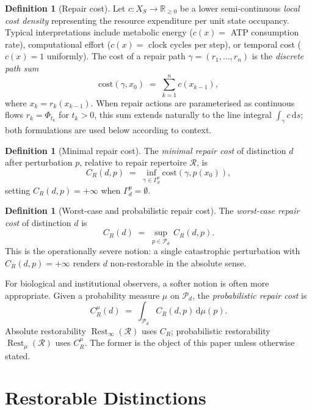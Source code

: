 \documentclass[12pt, oneside]{article}
\theoremstyle{plain}
\theoremstyle{definition}
\newtheorem{definition}[theorem]{Definition}
\theoremstyle{remark}
\theoremstyle{definition}
\DeclareMathOperator{\Rest}{Rest}
\newcommand{\CR}{C_{\!R}}
\newcommand{\Xsub}{X_S}
\newcommand{\Psub}{\mathcal{P}}
\begin{document}
\begin{definition}[Repair cost]
  Let $c : \Xsub \to \mathbb{R}_{\geq 0}$ be a lower semi-continuous
  \emph{local cost density} representing the resource expenditure per
  unit state occupancy.
  Typical interpretations include metabolic energy ($c(x) =$ ATP
  consumption rate), computational effort ($c(x) =$ clock cycles per
  step), or temporal cost ($c(x) = 1$ uniformly).
  The cost of a repair path $\gamma = (r_1, \ldots, r_n)$ is the
  \emph{discrete path sum}
  \[
    \mathrm{cost}(\gamma, x_0)
    \;=\;
    \sum_{k=1}^{n} c\!\left(x_{k-1}\right),
  \]
  where $x_k = r_k(x_{k-1})$.
  When repair actions are parameterised as continuous flows
  $r_k = \Phi_{t_k}$ for $t_k > 0$, this sum extends naturally to
  the line integral $\int_\gamma c\, \mathrm{d}s$; both formulations
  are used below according to context.
\end{definition}

\begin{definition}[Minimal repair cost]
  The \emph{minimal repair cost} of distinction $d$ after perturbation
  $p$, relative to repair repertoire $\mathcal{R}$, is
  \[
    \CR(d, p)
    \;=\;
    \inf_{\gamma \in \Gamma_d^p}
    \mathrm{cost}(\gamma, p(x_0)),
  \]
  setting $\CR(d,p) = +\infty$ when $\Gamma_d^p = \emptyset$.
\end{definition}

\begin{definition}[Worst-case and probabilistic repair cost]
  The \emph{worst-case repair cost} of distinction $d$ is
  \[
    \CR(d)
    \;=\;
    \sup_{p \in \Psub_d}\, \CR(d, p).
  \]
  This is the operationally severe notion: a single catastrophic
  perturbation with $\CR(d,p) = +\infty$ renders $d$ non-restorable
  in the absolute sense.

  For biological and institutional observers, a softer notion is
  often more appropriate.
  Given a probability measure $\mu$ on $\Psub_d$, the
  \emph{probabilistic repair cost} is
  \[
    \CR^\mu(d)
    \;=\;
    \int_{\Psub_d} \CR(d, p)\, \mathrm{d}\mu(p).
  \]
  Absolute restorability $\Rest_\infty(\mathcal{R})$ uses $\CR$;
  probabilistic restorability $\Rest_\mu(\mathcal{R})$ uses
  $\CR^\mu$.
  The former is the object of this paper unless otherwise stated.
\end{definition}


\section{Restorable Distinctions}
\label{sec:restorable}
\end{document}
